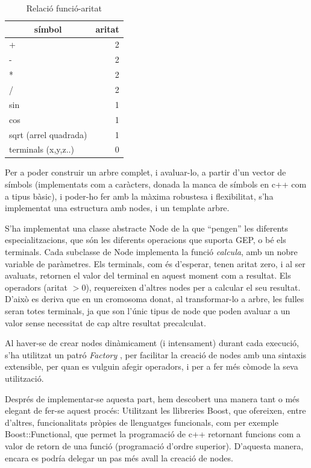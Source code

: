 \begin{table}
\centering
\caption{Relació funció-aritat}
\begin{tabular}{|l|r|}
\hline
\multicolumn{1}{|c|}{\textbf{símbol }} & \multicolumn{1}{c|}{\textbf{ aritat}} \\
\hline
\hline
+                     & 2 \\
-                     & 2 \\
*                     & 2 \\
/                     & 2 \\
sin                   & 1 \\
cos                   & 1 \\
sqrt (arrel quadrada) & 1 \\
terminals (x,y,z..)   & 0 \\
\hline
\end{tabular}
\label{table:func-aritat}
\end{table}

Per a poder construir un arbre complet, i avaluar-lo, a partir d'un vector de
símbols (implementats com a caràcters, donada la manca de símbols en c++ com a
tipus bàsic), i poder-ho fer amb la màxima robustesa i flexibilitat, s'ha
implementat una estructura amb nodes, i un template arbre. 

S'ha implementat una classe abstracte Node de la que ``pengen'' les diferents
especialitzacions, que són les diferents operacions que suporta GEP, o bé els
terminals.  Cada subclasse de Node implementa la funció \emph{calcula}, amb un
nobre variable de paràmetres.  Els terminals, com és d'esperar, tenen aritat
zero, i al ser avaluats, retornen el valor del terminal en aquest moment com a
resultat.  Els operadors (aritat $>0$), requereixen d'altres nodes per a
calcular el seu resultat.  D'això es deriva que en un cromosoma donat, al
transformar-lo a arbre, les fulles seran totes terminals, ja que son l'únic
tipus de node que poden avaluar a un valor sense necessitat de cap altre
resultat precalculat.

Al haver-se de crear nodes dinàmicament (i intensament) durant cada execució,
s'ha utilitzat un patró \emph{Factory} \cite{GoF94}, per facilitar la creació de nodes amb
una sintaxis extensible, per quan es vulguin afegir operadors, i per a fer més
còmode la seva utilització.

Després de implementar-se aquesta part, hem descobert una manera tant o més
elegant de fer-se aquest procés:  Utilitzant les llibreries Boost\cite{GABOOST}, que
ofereixen, entre d'altres, funcionalitats pròpies de llenguatges funcionals,
com per exemple Boost::Functional, que permet la programació de c++ retornant
funcions com a valor de retorn de una funció (programació d'ordre superior).  
D'aquesta manera, encara es podría delegar un pas més avall la creació de nodes.

